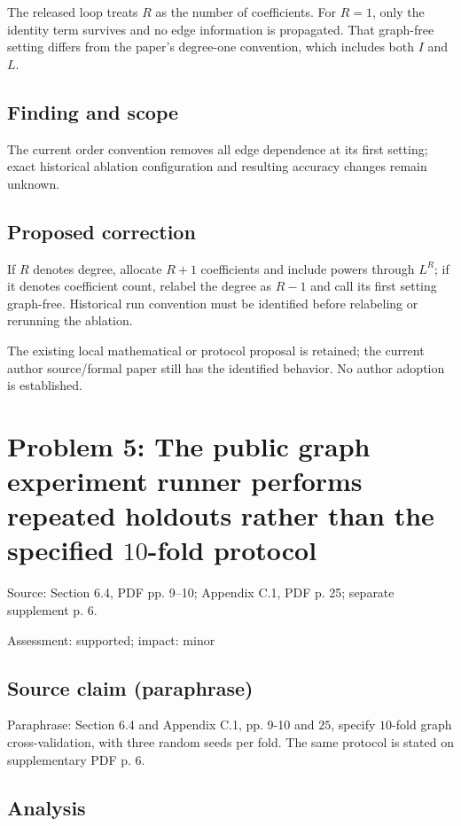 \documentclass[11pt]{article}
\begin{document}
The released loop treats \(R\) as the number of coefficients. For \(R=1\), only the identity term survives and no edge information is propagated. That graph-free setting differs from the paper's degree-one convention, which includes both \(I\) and \(L\).

\subsection*{Finding and scope}

The current order convention removes all edge dependence at its first setting; exact historical ablation configuration and resulting accuracy changes remain unknown.

\subsection*{Proposed correction}

If \(R\) denotes degree, allocate \(R+1\) coefficients and include powers through \(L^R\); if it denotes coefficient count, relabel the degree as \(R-1\) and call its first setting graph-free. Historical run convention must be identified before relabeling or rerunning the ablation.

The existing local mathematical or protocol proposal is retained; the current author source/formal paper still has the identified behavior. No author adoption is established.

\section*{Problem 5: The public graph experiment runner performs repeated holdouts rather than the specified \(10\)-fold protocol}

Source: Section 6.4, PDF pp. 9–10; Appendix C.1, PDF p. 25; separate supplement p. 6.

Assessment: supported; impact: minor

\subsection*{Source claim (paraphrase)}

Paraphrase: Section 6.4 and Appendix C.1, pp. 9-10 and \(25\), specify \(10\)-fold graph cross-validation, with three random seeds per fold. The same protocol is stated on supplementary PDF p. 6.

\subsection*{Analysis}
\end{document}
